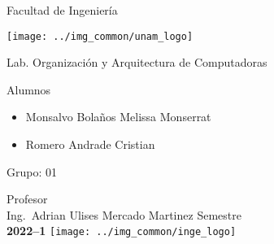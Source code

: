 \begin{titlepage}
  \centering

    {\scshape{\Huge Facultad de Ingeniería\par{}}}\vspace{0.25cm}

    \texttt{[image: ../img\_common/unam\_logo]}\vspace{0.5cm}

    {\scshape{\Large Lab. Organización y Arquitectura de Computadoras\par{}}}\vfill{}


    {\huge \textbf{\tituloTrabajo{}}}\vfill{}


    {\Large
      Alumnos
      \begin{itemize}

        \item Monsalvo Bolaños Melissa Monserrat

        \item Romero Andrade Cristian
      \end{itemize}
    }\vfill{}

      {\large Grupo: 01\par{}}\vfill{}

    {\large Profesor\\Ing.~Adrian Ulises Mercado Martinez}\vfill{}
    \vfil{}
    {\large Semestre\\\textbf{2022--1}}
    \vfill{}
    \texttt{[image: ../img\_common/inge\_logo]}

\end{titlepage}
